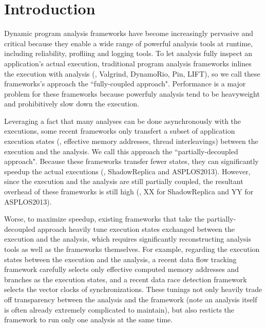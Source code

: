 \section{Introduction} \label{sec:intro}



Dynamic program analysis frameworks have become increasingly pervasive and 
critical because they enable a wide range of powerful analysis tools at 
runtime, including reliability, profliing and logging tools. To let analysis 
fully inspect an application's actual execution, traditional program analysis 
frameworks inlines the execution with analysis (\eg, Valgrind, DynamoRio, Pin, 
LIFT), so we call these frameworks's approach the ``fully-coupled 
approach". Performance is a major problem for these frameworks because 
powerfuly analysis tend to be heavyweight and prohibitively slow down the 
execution.


Leveraging a fact that many analyses can be done asynchronously with the 
executions, some recent frameworks only transfert a subset of application 
execution states (\eg, effective memory addresses, thread interleavings) 
between the execution and the analysis. We call this approach the 
``partially-decoupled approach". Because these frameworks transfer fewer 
states, they can significantly speedup the actual executions (\eg, 
ShadowReplica and ASPLOS2013). However, since the execution and the analysis 
are still partially coupled, the resultant overhead of these frameworks is 
still high (\eg, XX for ShadowReplica and YY for ASPLOS2013).


Worse, to maximize speedup, existing frameworks that take the 
partially-decoupled approach heavily tune execution states exchanged between 
the execution and the analysis, which requires significantly reconstructing 
analysis tools as well as the frameworks themselves. For example, regarding the 
execution states between the execution and the analysis, a recent data flow 
tracking framework carefully selects only effective computed memory addresses 
and branches as the execution states, and a recent data race detection 
framework selects the vector clocks of synchronizations. These tunings not only 
heavily trade off transparency between the analysis and the framework (note an 
analysis itself is often already extremely complicated to maintain), but also 
resticts the framework to run only one analysis at the same time.

